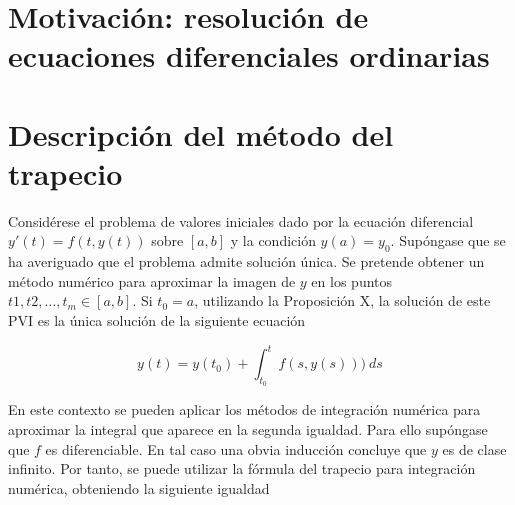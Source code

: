\documentclass{article}
\theoremstyle{theorem-style}  %
\theoremstyle{definition}
\theoremstyle{example-style}
\begin{document}
\maketitle



\newpage
\tableofcontents
\newpage


\section{Motivación: resolución de ecuaciones diferenciales ordinarias}


\section{Descripción del método del trapecio}

	Considérese el problema de valores iniciales dado por la ecuación diferencial $y'(t) = f(t,y(t))$ sobre $[a,b]$ y la condición $y(a) = y_0$. Supóngase que se ha averiguado que el problema admite solución única. Se pretende obtener un método numérico para aproximar la imagen de $y$ en los puntos $t1, t2, \ldots, t_m \in [a,b]$. Si $t_0 = a$, utilizando la Proposición X, la solución de este PVI es la única solución de la siguiente ecuación
	
	\begin{equation}
		y(t)  = y(t_0) + \int_{t_0}^{t} f(s,y(s))) \ ds
	\end{equation}
	
	En este contexto se pueden aplicar los métodos de integración numérica para aproximar la integral que aparece en la segunda igualdad. Para ello supóngase que $f$ es diferenciable. En tal caso una obvia inducción concluye que $y$ es de clase infinito. Por tanto, se puede utilizar la fórmula del trapecio para integración numérica, obteniendo la siguiente igualdad
	
\end{document}
